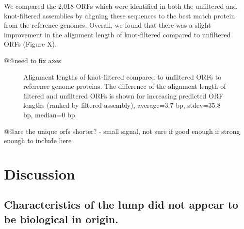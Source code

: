 \documentclass[11pt]{article} %
\begin{document}
We compared the 2,018 ORFs which were identified in both the unfiltered and knot-filtered assemblies by aligning these sequences to the best match protein from the reference genomes.  Overall, we found that there was a slight improvement in the alignment length of knot-filtered compared to unfiltered ORFs (Figure X).

@@need to fix axes

\begin{figure}
\caption{Alignment lengths of knot-filtered compared to unfiltered ORFs to reference genome proteins.  The difference of the alignment length of filtered and unfiltered ORFs is shown for increasing predicted ORF lengths (ranked by filtered assembly), average=3.7 bp, stdev=35.8 bp, median=0 bp.}
\end{figure}


@@are the unique orfs shorter? - small signal, not sure if good enough if strong enough to include here

\section{Discussion}

\subsection{Characteristics of the lump did not appear to be biological in origin.}
\end{document}

